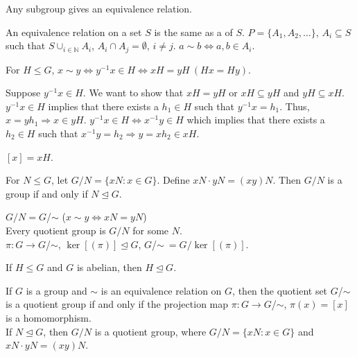 \documentclass[11pt,letterpaper]{jacky}
\begin{document}
Any subgroup gives an equivalence relation.

\begin{defi}
    An equivalence relation on a set $S$ is the same as a  of $S$. $P=\{A_1,A_2,\ldots\}$, $A_i\subseteq S$ such that $S\cup_{i\in\mathbb{N}}A_i$, $A_i\cap A_j=\emptyset$, $i\ne j$. $a\sim b\Leftrightarrow a,b\in A_i$.
\end{defi}

\begin{prop}
    For $H\le G$, $x\sim y\Leftrightarrow y^{-1}x\in H\Leftrightarrow xH=yH\ (Hx=Hy)$.
\end{prop}

\begin{pf}
    Suppose $y^{-1}x\in H$. We want to show that $xH=yH$ or $xH\subseteq yH$ and $yH\subseteq xH$. $y^{-1}x\in H$ implies that there exists a $h_1\in H$ such that $y^{-1}x=h_1$. Thus, $x=yh_1\Rightarrow x\in yH$. $y^{-1}x\in H\Leftrightarrow x^{-1}y\in H$ which implies that there exists a $h_2\in H$ such that $x^{-1}y=h_2\Rightarrow y=xh_2\in xH$.
\end{pf}

\begin{note}
    $[x]=xH$.
\end{note}

\begin{prop}
    For $N\le G$, let $G/N=\{xN:x\in G\}$. Define $xN\cdot yN=(xy)N$. Then $G/N$ is a group if and only if $N\unlhd G$.
\end{prop}

$G/N=G$/$\sim$ ($x\sim y\Leftrightarrow xN=yN$)\\

Every quotient group is $G/N$ for some $N$.\\

$\pi:G\rightarrow G$/$\sim$, $\ker[(\pi)]\unlhd G$, $G$/$\sim\ =G/\ker[(\pi)]$.

\begin{prop}
    If $H\le G$ and $G$ is abelian, then $H\unlhd G$.
\end{prop}

If $G$ is a group and $\sim$ is an equivalence relation on $G$, then the quotient set $G$/$\sim$ is a quotient group if and only if the projection map $\pi:G\rightarrow G$/$\sim$, $\pi(x)=[x]$ is a homomorphism.\\

If $N\unlhd G$, then $G/N$ is a quotient group, where $G/N=\{xN:x\in G\}$ and $xN\cdot yN=(xy)N$.\\
\end{document}
